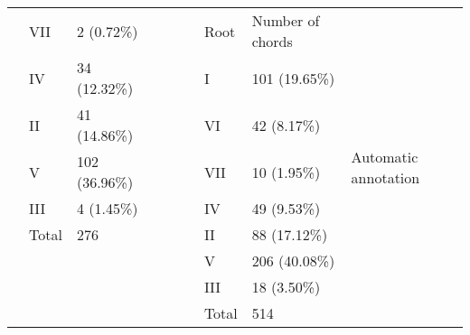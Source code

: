 \begin{table}[]
{\begin{tabular}{lllll|l|l|l|l|}
\multicolumn{1}{|l|}{} & \multicolumn{1}{l|}{VII} & \multicolumn{1}{l|}{2 (0.72\%)} & \multicolumn{1}{l|}{} &  &  & Root & Number of chords & \multirow{9}{*}{Automatic annotation} \\ \cline{2-3} \cline{7-8}
\multicolumn{1}{|l|}{} & \multicolumn{1}{l|}{IV} & \multicolumn{1}{l|}{34 (12.32\%)} & \multicolumn{1}{l|}{} &  &  & I & 101 (19.65\%) &  \\ \cline{2-3} \cline{7-8}
\multicolumn{1}{|l|}{} & \multicolumn{1}{l|}{II} & \multicolumn{1}{l|}{41 (14.86\%)} & \multicolumn{1}{l|}{} &  &  & VI & 42 (8.17\%) &  \\ \cline{2-3} \cline{7-8}
\multicolumn{1}{|l|}{} & \multicolumn{1}{l|}{V} & \multicolumn{1}{l|}{102 (36.96\%)} & \multicolumn{1}{l|}{} &  &  & VII & 10 (1.95\%) &  \\ \cline{2-3} \cline{7-8}
\multicolumn{1}{|l|}{} & \multicolumn{1}{l|}{III} & \multicolumn{1}{l|}{4 (1.45\%)} & \multicolumn{1}{l|}{} &  &  & IV & 49 (9.53\%) &  \\ \cline{2-3} \cline{7-8}
\multicolumn{1}{|l|}{} & \multicolumn{1}{l|}{Total} & \multicolumn{1}{l|}{276} & \multicolumn{1}{l|}{} &  &  & II & 88 (17.12\%) &  \\ \cline{1-4} \cline{7-8}
 &  &  &  &  &  & V & 206 (40.08\%) &  \\ \cline{7-8}
 &  &  &  &  &  & III & 18 (3.50\%) &  \\ \cline{7-8}
 &  &  &  &  &  & Total & 514 &  \\ \cline{6-9}
\end{tabular}
}
\label{my-label}
\end{table}


\newpage
